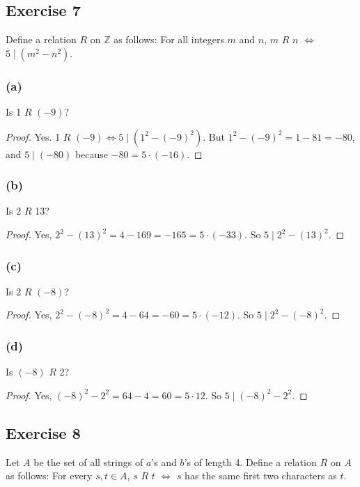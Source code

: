\documentclass[14pt]{extarticle}
\newcommand{\Z}{\mathbb{Z}}
\begin{document}
\subsection{Exercise 7}
Define a relation $R$ on $\Z$ as follows: For all integers $m$ and $n$, $m$ $R$ $n$ $\iff$ \(5 \mid (m^2 - n^2)\).

\subsubsection{(a)}
Is 1 $R$ $(-9)$?

\begin{proof}
Yes. 1 $R$ \((-9) \iff 5 \mid (1^2 - (-9)^2)\). But \(1^2 - (-9)^2 = 1 - 81 = -80\), and \(5 \mid (-80)\) because 
\(-80 = 5 \cdot (-16)\).
\end{proof}

\subsubsection{(b)}
Is 2 $R$ 13?

\begin{proof}
Yes, \(2^2 - (13)^2 = 4 - 169 = -165 = 5 \cdot (-33)\). So \(5 \mid 2^2 - (13)^2\).
\end{proof}

\subsubsection{(c)}
Is 2 $R$ $(-8)$?

\begin{proof}
Yes, \(2^2 - (-8)^2 = 4 - 64 = -60 = 5 \cdot (-12)\). So \(5 \mid 2^2 - (-8)^2\).
\end{proof}

\subsubsection{(d)}
Is $(-8)$ $R$ 2?

\begin{proof}
Yes, \((-8)^2 - 2^2 = 64 - 4 = 60 = 5 \cdot 12\). So \(5 \mid (-8)^2 - 2^2\).
\end{proof}

\subsection{Exercise 8}
Let $A$ be the set of all strings of $a$’s and $b$’s of length 4. Define a relation $R$ on $A$ as follows: For 
every \(s, t \in A\), $s$ $R$ $t$ $\iff$ $s$ has the same first two characters as $t$.
\end{document}
